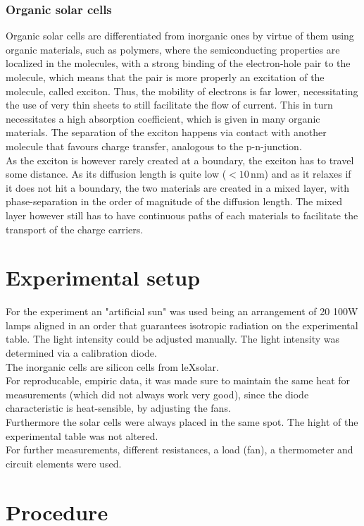 \documentclass[english,  %
parskip=full,  %
headsepline]{scrartcl}
\begin{document}
\subsubsection{Organic solar cells} 
Organic solar cells are differentiated from inorganic ones by virtue of them using organic materials, such as polymers, where the semiconducting properties are localized in the molecules, with a strong binding of the electron-hole pair to the molecule, which means that the pair is more properly an excitation of the molecule, called exciton. Thus, the mobility of electrons is far lower, necessitating the use of very thin sheets to still facilitate  the flow of current. This in turn necessitates a high absorption coefficient, which is given in many organic materials. The separation of the exciton happens via contact with another molecule that favours charge transfer, analogous to the p-n-junction. \\
As the exciton is however rarely created at a boundary, the exciton has to travel some distance. As its diffusion length is quite low ($<10\,$nm) and as it relaxes if it does not hit a boundary, the two materials are created in a mixed layer, with phase-separation in the order of magnitude of the diffusion length. The mixed layer however still has to have continuous paths of each materials to facilitate the transport of the charge carriers.
\section{Experimental setup}
For the experiment an "artificial sun" was used being an arrangement of 20 100W lamps aligned in an order that guarantees isotropic radiation on the experimental table. The light intensity could be adjusted manually. The light intensity was determined via a calibration diode.
\\
The inorganic cells are silicon cells from leXsolar.\\
For reproducable, empiric data, it was made sure to maintain the same heat for measurements (which did not always work very good), since the diode characteristic is heat-sensible, by adjusting the fans.\\
Furthermore the solar cells were always placed in the same spot. The hight of the experimental table was not altered.\\
For further measurements, different resistances, a load (fan), a thermometer and circuit elements were used.
\clearpage
\section{Procedure}\label{procedure}
\end{document}
